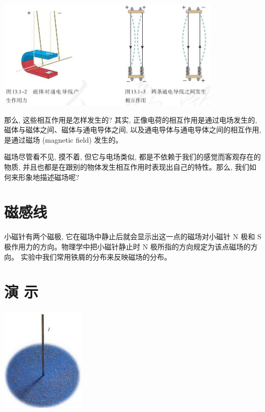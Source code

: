 \documentclass[10pt]{article}
\begin{document}
\begin{center}
\includegraphics[max width=0.8\textwidth]{images/01911d5f-8e38-70c0-b5b8-2b399bd115b6_110_700621.jpg}
\end{center}

那么, 这些相互作用是怎样发生的? 其实, 正像电荷的相互作用是通过电场发生的, 磁体与磁体之间、磁体与通电导体之间, 以及通电导体与通电导体之间的相互作用, 是通过磁场 (magnetic field) 发生的。

磁场尽管看不见, 摸不着, 但它与电场类似, 都是不依赖于我们的感觉而客观存在的物质, 并且也都是在跟别的物体发生相互作用时表现出自己的特性。那么, 我们如何来形象地描述磁场呢?

\section*{磁感线}

小磁针有两个磁极, 它在磁场中静止后就会显示出这一点的磁场对小磁针 \(\mathrm{N}\) 极和 \(\mathrm{S}\) 极作用力的方向。物理学中把小磁针静止时 \(\mathrm{N}\) 极所指的方向规定为该点磁场的方向。 实验中我们常用铁屑的分布来反映磁场的分布。

\section*{演 示}

\begin{center}
\includegraphics[max width=0.3\textwidth]{images/01911d5f-8e38-70c0-b5b8-2b399bd115b6_111_422009.jpg}
\end{center}
\end{document}

